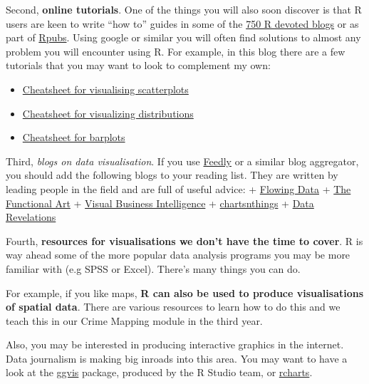 \documentclass[]{book}
\providecommand{\tightlist}{%
  \setlength{\itemsep}{0pt}\setlength{\parskip}{0pt}}
\theoremstyle{definition}
\theoremstyle{definition}
\theoremstyle{definition}
\theoremstyle{remark}
\begin{document}
Second, \textbf{online tutorials}. One of the things you will also soon
discover is that R users are keen to write ``how to'' guides in some of
the \href{http://www.r-bloggers.com/}{750 R devoted blogs} or as part of
\href{https://rpubs.com/}{Rpubs}. Using google or similar you will often
find solutions to almost any problem you will encounter using R. For
example, in this blog there are a few tutorials that you may want to
look to complement my own:

\begin{itemize}
\tightlist
\item
  \href{http://rforpublichealth.blogspot.co.uk/2013/11/ggplot2-cheatsheet-for-scatterplots.html}{Cheatsheet
  for visualising scatterplots}\\
\item
  \href{http://rforpublichealth.blogspot.co.uk/2014/02/ggplot2-cheatsheet-for-visualizing.html}{Cheatsheet
  for visualizing distributions}\\
\item
  \href{http://rforpublichealth.blogspot.co.uk/2014_01_01_archive.html}{Cheatsheet
  for barplots}
\end{itemize}

Third, \emph{blogs on data visualisation}. If you use
\href{https://feedly.com/index.html\#discover}{Feedly} or a similar blog
aggregator, you should add the following blogs to your reading list.
They are written by leading people in the field and are full of useful
advice: + \href{http://flowingdata.com/}{Flowing Data} +
\href{http://www.thefunctionalart.com/}{The Functional Art} +
\href{http://www.perceptualedge.com/blog/}{Visual Business Intelligence}
+ \href{https://kpq.github.io/chartsnthings/}{chartsnthings} +
\href{http://www.datarevelations.com/category/blog}{Data Revelations}

Fourth, \textbf{resources for visualisations we don't have the time to
cover}. R is way ahead some of the more popular data analysis programs
you may be more familiar with (e.g SPSS or Excel). There's many things
you can do.

For example, if you like maps, \textbf{R can also be used to produce
visualisations of spatial data}. There are various resources to learn
how to do this and we teach this in our Crime Mapping module in the
third year.

Also, you may be interested in producing interactive graphics in the
internet. Data journalism is making big inroads into this area. You may
want to have a look at the \href{http://ggvis.rstudio.com/}{ggvis}
package, produced by the R Studio team, or
\href{http://rcharts.io/}{rcharts}.
\end{document}
